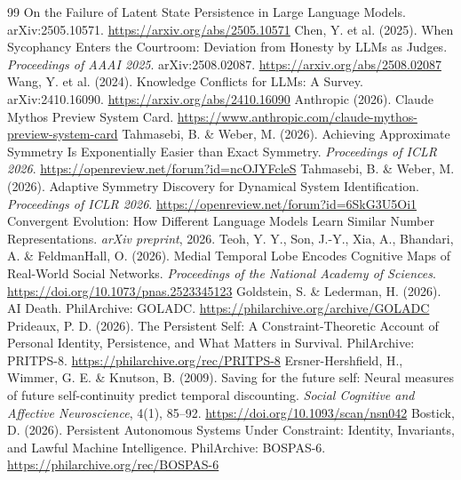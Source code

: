 \documentclass[11pt]{article}
\begin{document}
\begin{thebibliography}{99}
 On the Failure of Latent State Persistence in Large Language Models. arXiv:2505.10571. \url{https://arxiv.org/abs/2505.10571}
 Chen, Y. et al. (2025). When Sycophancy Enters the Courtroom: Deviation from Honesty by LLMs as Judges. \textit{Proceedings of AAAI 2025}. arXiv:2508.02087. \url{https://arxiv.org/abs/2508.02087}
 Wang, Y. et al. (2024). Knowledge Conflicts for LLMs: A Survey. arXiv:2410.16090. \url{https://arxiv.org/abs/2410.16090}
 Anthropic (2026). Claude Mythos Preview System Card. \url{https://www.anthropic.com/claude-mythos-preview-system-card}
 Tahmasebi, B. \& Weber, M. (2026). Achieving Approximate Symmetry Is Exponentially Easier than Exact Symmetry. \textit{Proceedings of ICLR 2026}. \url{https://openreview.net/forum?id=ncOJYFcleS}
 Tahmasebi, B. \& Weber, M. (2026). Adaptive Symmetry Discovery for Dynamical System Identification. \textit{Proceedings of ICLR 2026}. \url{https://openreview.net/forum?id=6SkG3U5Oi1}
 Convergent Evolution: How Different Language Models Learn Similar Number Representations. \textit{arXiv preprint}, 2026.
 Teoh, Y. Y., Son, J.-Y., Xia, A., Bhandari, A. \& FeldmanHall, O. (2026). Medial Temporal Lobe Encodes Cognitive Maps of Real-World Social Networks. \textit{Proceedings of the National Academy of Sciences}. \url{https://doi.org/10.1073/pnas.2523345123}
 Goldstein, S. \& Lederman, H. (2026). AI Death. PhilArchive: GOLADC. \url{https://philarchive.org/archive/GOLADC}
 Prideaux, P. D. (2026). The Persistent Self: A Constraint-Theoretic Account of Personal Identity, Persistence, and What Matters in Survival. PhilArchive: PRITPS-8. \url{https://philarchive.org/rec/PRITPS-8}
 Ersner-Hershfield, H., Wimmer, G. E. \& Knutson, B. (2009). Saving for the future self: Neural measures of future self-continuity predict temporal discounting. \textit{Social Cognitive and Affective Neuroscience}, 4(1), 85--92. \url{https://doi.org/10.1093/scan/nsn042}
 Bostick, D. (2026). Persistent Autonomous Systems Under Constraint: Identity, Invariants, and Lawful Machine Intelligence. PhilArchive: BOSPAS-6. \url{https://philarchive.org/rec/BOSPAS-6}
\end{thebibliography}
\end{document}
